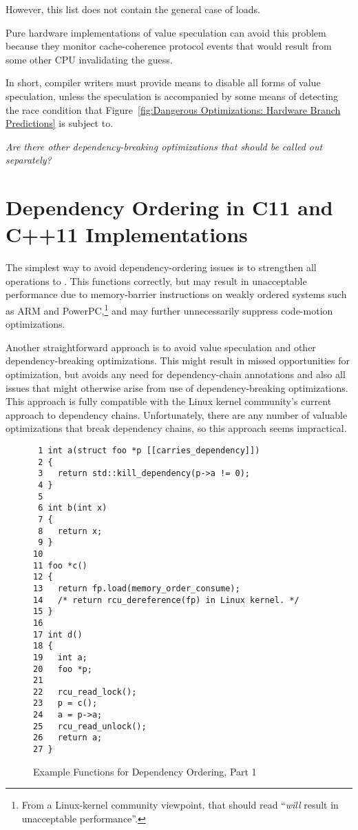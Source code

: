 \documentclass[letterpaper,twocolumn,10pt]{article}
\begin{document}
However, this list does not contain the general case of
 loads.

Pure hardware implementations of value speculation can avoid this problem
because they monitor cache-coherence protocol events that would result
from some other CPU invalidating the guess.

In short, compiler writers must provide means to disable all forms of
value speculation, unless the speculation is accompanied by some means
of detecting the race condition that
Figure~\ref{fig:Dangerous Optimizations: Hardware Branch Predictions}
is subject to.

\emph{Are there other dependency-breaking optimizations that should be
called out separately?}

\section{Dependency Ordering in C11 and C++11 Implementations}
\label{sec:Dependency Ordering in C11 and C++11 Implementations}

The simplest way to avoid dependency-ordering issues is to strengthen all
 operations to .
This functions correctly, but may result in unacceptable performance
due to memory-barrier instructions on weakly ordered systems such
as ARM and PowerPC,\footnote{
	From a Linux-kernel community viewpoint, that should read
	``\emph{will} result in unacceptable performance''.}
and may further unnecessarily suppress
code-motion optimizations.

Another straightforward approach is to avoid value speculation and
other dependency-breaking optimizations.
This might result in missed opportunities for optimization, but avoids
any need for dependency-chain annotations and also all issues that might
otherwise arise from use of dependency-breaking optimizations.
This approach is fully compatible with the Linux kernel community's
current approach to dependency chains.
Unfortunately, there are any number of valuable optimizations that
break dependency chains, so this approach seems impractical.

\begin{figure}[tbp]
{ \scriptsize
\begin{verbatim}
 1 int a(struct foo *p [[carries_dependency]])
 2 {
 3   return std::kill_dependency(p->a != 0);
 4 }
 5 
 6 int b(int x)
 7 {
 8   return x;
 9 }
10 
11 foo *c()
12 {
13   return fp.load(memory_order_consume);
14   /* return rcu_dereference(fp) in Linux kernel. */
15 }
16 
17 int d()
18 {
19   int a;
20   foo *p;
21 
22   rcu_read_lock();
23   p = c();
24   a = p->a;
25   rcu_read_unlock();
26   return a;
27 }
\end{verbatim}
}
\caption{Example Functions for Dependency Ordering, Part 1}
\label{fig:Example Functions for Dependency Ordering, Part 1}
\end{figure}
\end{document}
